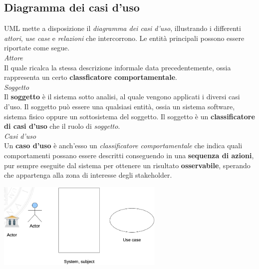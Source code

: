 \documentclass{article}
\begin{document}
\subsection*{Diagramma dei casi d'uso}
\large
UML mette a disposizione il \textit{diagramma dei casi d'uso}, illustrando i differenti \textit{attori}, \textit{use case} e \textit{relazioni} che intercorrono. Le entità principali possono essere riportate come segue.\vspace*{14pt}\\
\textit{Attore}\\Il quale ricalca la stessa descrizione informale data precedentemente, ossia rappresenta un certo \textbf{classficatore comportamentale}.\vspace*{14pt}\\
\textit{Soggetto}\\Il \textbf{soggetto} è il sistema sotto analisi, al quale vengono applicati i diversi casi d'uso. Il soggetto può essere una qualsiasi entità, ossia un sistema software, sistema fisico oppure un sottosistema del soggetto. Il soggetto è un \textbf{classificatore di casi d'uso} che il ruolo di \textit{soggetto}.\vspace*{14pt}\\
\textit{Casi d'uso}\\Un \textbf{caso d'uso} è anch'esso un \textit{classificatore comportamentale} che indica quali comportamenti possano essere descritti conseguendo in una \textbf{sequenza di azioni}, pur sempre eseguite dal sistema per ottenere un  risultato \textbf{osservabile}, sperando che appartenga alla zona di interesse degli stakeholder.\vspace*{14pt}\\
\begin{center}
    \includegraphics[width=0.6\textwidth]{foto 2.png}
\end{center}
\end{document}
